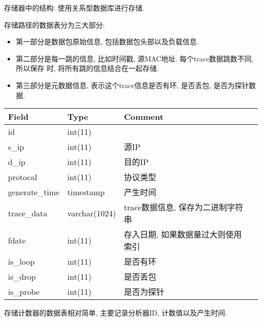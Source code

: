 {\begin{mdframed}[everyline=true]
存储器中的结构: 使用关系型数据库进行存储.

存储路径的数据表分为三大部分:

\begin{itemize}
    \setlength\itemsep{0.1em}
    \item 第一部分是数据包原始信息, 包括数据包头部以及负载信息.
    \item 第二部分是每一跳的信息, 比如时间戳, 源MAC地址. 每个trace数据跳数不同,
            所以保存 时, 将所有跳的信息结合在一起存储.
    \item 第三部分是元数据信息, 表示这个trace信息是否有环, 是否丢包,
            是否为探针数据.
\end{itemize}


\begin{center}
    \begin{tabular}{llll}   \hline
    Field          & Type          & Comment                   \\ \hline
    id             & int(11)       &                           \\
    s\_ip          & int(11)       & 源IP                       \\
    d\_ip          & int(11)       & 目的IP                      \\
    protocal       & int(11)       & 协议类型                      \\
    generate\_time & timestamp     & 产生时间                      \\
    trace\_data    & varchar(1024) & trace数据信息, 保存为二进制字符串    \\
    fdate          & int(11)       & 存入日期, 如果数据量过大则使用索引 \\
    is\_loop       & int(11)       & 是否有环                      \\
    is\_drop       & int(11)       & 是否丢包                      \\
    is\_probe      & int(11)       & 是否为探针                    \\ \hline
    \end{tabular}
    \label{tbl_traffic_data}
\end{center}

存储计数器的数据表相对简单, 主要记录分析器ID, 计数值以及产生时间.


\end{mdframed}}
